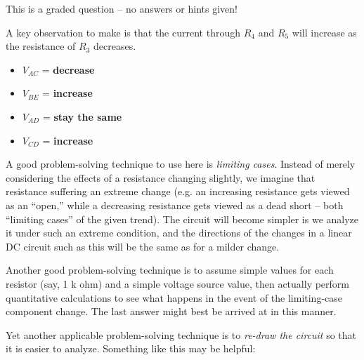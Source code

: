 
This is a graded question -- no answers or hints given!







A key observation to make is that the current through $R_4$ and $R_5$ will increase as the resistance of $R_3$ decreases.

\begin{itemize}
\item{} $V_{AC}$ = {\bf decrease}
\vskip 10pt
\item{} $V_{BE}$ = {\bf increase}
\vskip 10pt
\item{} $V_{AD}$ = {\bf stay the same}
\vskip 10pt
\item{} $V_{CD}$ = {\bf increase}
\end{itemize}

A good problem-solving technique to use here is {\it limiting cases}.  Instead of merely considering the effects of a resistance changing slightly, we imagine that resistance suffering an extreme change (e.g. an increasing resistance gets viewed as an ``open,'' while a decreasing resistance gets viewed as a dead short -- both ``limiting cases'' of the given trend).  The circuit will become simpler is we analyze it under such an extreme condition, and the directions of the changes in a linear DC circuit such as this will be the same as for a milder change.

Another good problem-solving technique is to assume simple values for each resistor (say, 1 k ohm) and a simple voltage source value, then actually perform quantitative calculations to see what happens in the event of the limiting-case component change.  The last answer might best be arrived at in this manner.

\vskip 10pt

Yet another applicable problem-solving technique is to {\it re-draw the circuit} so that it is easier to analyze.  Something like this may be helpful:


